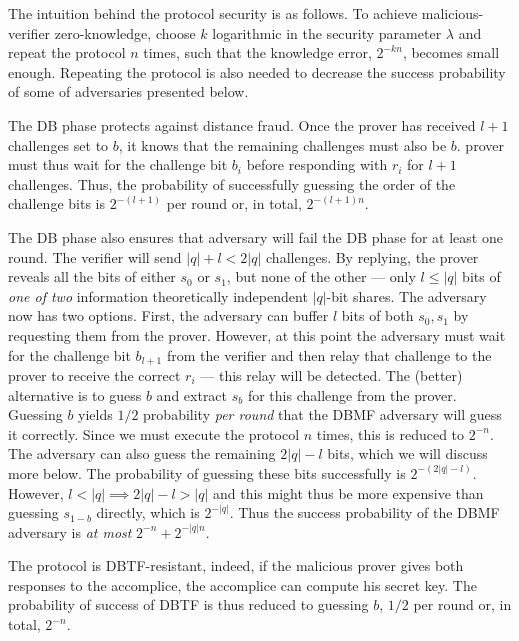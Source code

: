 The intuition behind the protocol security is as follows.
To achieve malicious-verifier zero-knowledge, choose \(k\) logarithmic in the 
security parameter \(\lambda\) and repeat the protocol \(n\) times, such that 
the knowledge error, \(2^{-kn}\), becomes small enough.
Repeating the protocol is also needed to decrease the success probability of 
some of adversaries presented below.

The \ac{DB} phase protects against distance fraud.
Once the prover has received \(l+1\) challenges set to \(b\), it knows that the 
remaining challenges must also be \(b\).
 prover must thus wait for the challenge bit \(b_i\) before 
responding with \(r_i\) for \(l+1\) challenges.
Thus, the probability of successfully guessing the order of the challenge bits 
is \(2^{-(l+1)}\) per round or, in total, \(2^{-(l+1)n}\).

The \ac{DB} phase also ensures that  adversary will fail the \ac{DB} 
phase for at least one round.
The verifier will send \(|q| + l < 2|q|\) challenges.
By replying, the prover reveals all the bits of either \(s_0\) or \(s_1\), but 
none of the other --- only \(l\leq |q|\) bits of \emph{one of two} information 
theoretically independent \(|q|\)-bit shares.
The adversary now has two options.
First, the adversary can buffer \(l\) bits of both \(s_0, s_1\) by requesting 
them from the prover.
However, at this point the adversary must wait for the challenge bit 
\(b_{l+1}\) from the verifier and then relay that challenge to the prover to 
receive the correct \(r_i\) --- this relay will be detected.
The (better) alternative is to guess \(b\) and extract \(s_b\) for this 
challenge from the prover.
Guessing \(b\) yields \(1/2\) probability \emph{per round} that the \ac{DBMF} 
adversary will guess it correctly.
Since we must execute the protocol \(n\) times, this is reduced to \(2^{-n}\).
The adversary can also guess the remaining \(2|q|-l\) bits, which we will 
discuss more below.
The probability of guessing these bits successfully is \(2^{-(2|q|-l)}\).
However, \(l < |q| \implies 2|q|-l > |q|\) and this might thus be more 
expensive than guessing \(s_{1-b}\) directly, which is \(2^{-|q|}\).
Thus the success probability of the \ac{DBMF} adversary is \emph{at most} 
\(2^{-n}+2^{-|q|n}\).

The protocol is \ac{DBTF}-resistant, indeed, if the malicious prover gives both 
responses to the accomplice, the accomplice can compute his secret key.
The probability of success of \ac{DBTF} is thus reduced to guessing \(b\), \ie 
\(1/2\) per round or, in total, \(2^{-n}\).

